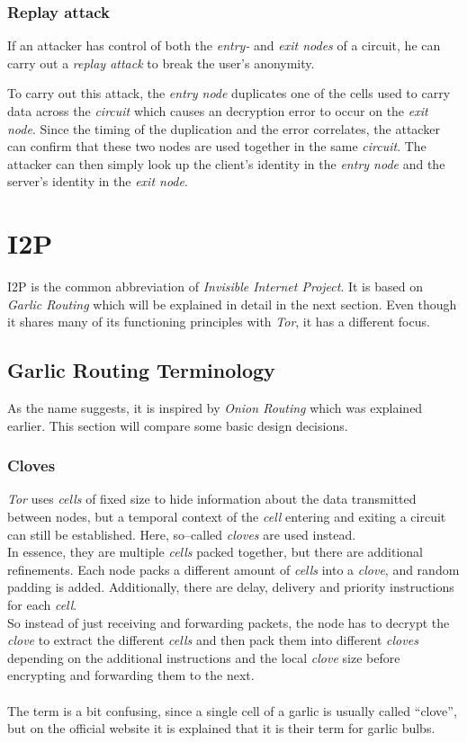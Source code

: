 \documentclass{sig-alternate}
\begin{document}
\subsubsection{Replay attack}
If an attacker has control of both the \emph{entry-} and \emph{exit nodes} of a circuit, he
can carry out a \emph{replay attack}\cite{pries2007} to break the user's anonymity.

To carry out this attack, the \emph{entry node} duplicates one of the cells used to carry data
across the \emph{circuit} which causes an decryption error to occur on the \emph{exit node}.
Since the timing of the duplication and the error correlates, the attacker can confirm that
these two nodes are used together in the same \emph{circuit}. The attacker can then simply
look up the client's identity in the \emph{entry node} and the server's identity in the
\emph{exit node}.

\section{I2P}
I2P is the common abbreviation of \emph{Invisible Internet Project}.
It is based on \emph{Garlic Routing} which will be explained in detail in the next section.
Even though it shares many of its functioning principles with \emph{Tor}, it has a different focus.

\subsection{Garlic Routing Terminology}
As the name suggests, it is inspired by \emph{Onion Routing} which was explained earlier.
This section will compare some basic design decisions.

\subsubsection{Cloves}
\emph{Tor} uses \emph{cells} of fixed size to hide information about the data transmitted between nodes, but a temporal context of the \emph{cell} entering and exiting a circuit can still be established.
Here, so--called \emph{cloves} are used instead.
\\
In essence, they are multiple \emph{cells} packed together, but there are additional refinements.
Each node packs a different amount of \emph{cells} into a \emph{clove}, and random padding is added.
Additionally, there are delay, delivery and priority instructions for each \emph{cell}.
\\
So instead of just receiving and forwarding packets, the node has to decrypt the \emph{clove} to extract the different \emph{cells} and then pack them into different \emph{cloves} depending on the additional instructions and the local \emph{clove} size before encrypting and forwarding them to the next\cite{zantout2011}.
\\
\\
The term is a bit confusing, since a single cell of a garlic is usually called ``clove'', but on the official website it is explained that it is their term for garlic bulbs\cite{garlic}.
\end{document}
